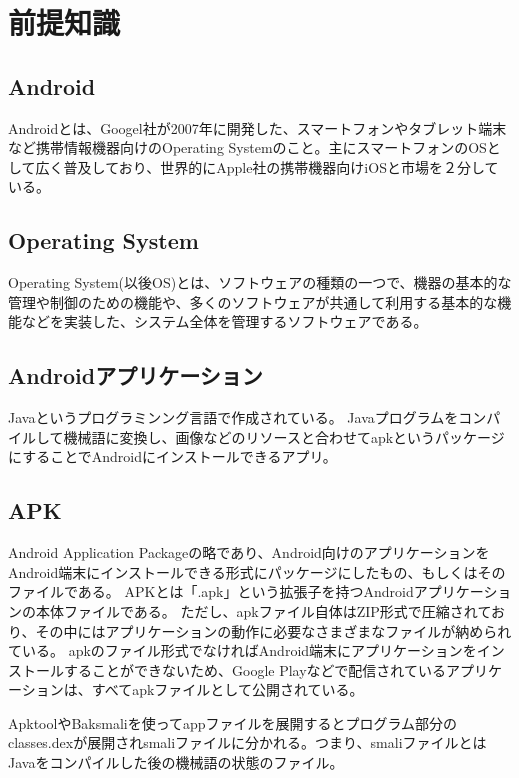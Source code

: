 \newpage
\section{前提知識}

\subsection{Android}
Androidとは、Googel社が2007年に開発した、スマートフォンやタブレット端末など携帯情報機器向けのOperating Systemのこと。主にスマートフォンのOSとして広く普及しており、世界的にApple社の携帯機器向けiOSと市場を２分している。

\subsection{Operating System}
Operating System(以後OS)とは、ソフトウェアの種類の一つで、機器の基本的な管理や制御のための機能や、多くのソフトウェアが共通して利用する基本的な機能などを実装した、システム全体を管理するソフトウェアである。

\subsection{Androidアプリケーション}
Javaというプログラミンング言語で作成されている。
Javaプログラムをコンパイルして機械語に変換し、画像などのリソースと合わせてapkというパッケージにすることでAndroidにインストールできるアプリ。

\subsection{APK}
Android Application Packageの略であり、Android向けのアプリケーションをAndroid端末にインストールできる形式にパッケージにしたもの、もしくはそのファイルである。
APKとは「.apk」という拡張子を持つAndroidアプリケーションの本体ファイルである。
ただし、apkファイル自体はZIP形式で圧縮されており、その中にはアプリケーションの動作に必要なさまざまなファイルが納められている。
apkのファイル形式でなければAndroid端末にアプリケーションをインストールすることができないため、Google Playなどで配信されているアプリケーションは、すべてapkファイルとして公開されている。

ApktoolやBaksmaliを使ってappファイルを展開するとプログラム部分のclasses.dexが展開されsmaliファイルに分かれる。つまり、smaliファイルとはJavaをコンパイルした後の機械語の状態のファイル。
